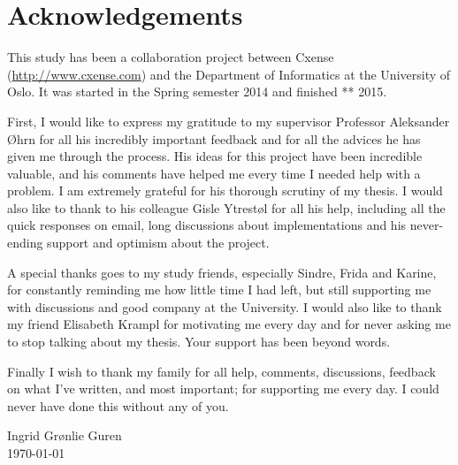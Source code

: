 \chapter*{Acknowledgements}
This study has been a collaboration project between Cxense (\url{http://www.cxense.com}) and the Department of Informatics at the University of Oslo. It was started in the Spring semester 2014 and finished ** 2015. 

First, I would like to express my gratitude to my supervisor Professor Aleksander Øhrn for all his incredibly important feedback and for all the advices he has given me through the process. 
His ideas for this project have been incredible valuable, and his comments have helped me every time I needed help with a problem. I am extremely grateful for his thorough scrutiny of my thesis. 
I would also like to thank to his colleague Gisle Ytrestøl for all his help, including all the quick responses on email, long discussions about implementations and his never-ending support and optimism about the project. 

A special thanks goes to my study friends, 
especially Sindre, Frida and Karine, 
for constantly reminding me how little time I had left, but still supporting me with discussions and good company at the University. I would also like to thank my friend Elisabeth Krampl for motivating me every day and for never asking me to stop talking about my thesis. Your support has been beyond words.

Finally I wish to thank my family for all help, comments, discussions, feedback on what I've written, and most important; for supporting me every day. I could never have done this without any of you. 


\begin{flushright}
Ingrid Grønlie Guren\\
\today
\end{flushright}